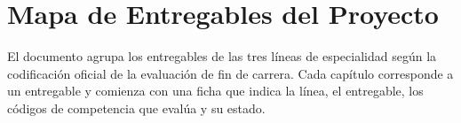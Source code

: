 \chapter*{Mapa de Entregables del Proyecto}

El documento agrupa los entregables de las tres líneas de especialidad según la
codificación oficial de la evaluación de fin de carrera. Cada capítulo corresponde a un
entregable y comienza con una ficha que indica la línea, el entregable, los códigos de
competencia que evalúa y su estado.

